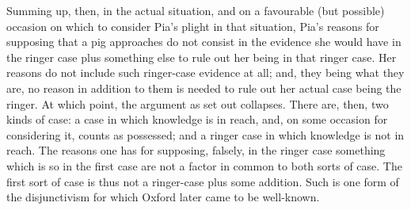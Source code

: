 Summing up, then, in the actual situation, and on a favourable (but possible) occasion on which to consider Pia’s plight in that situation, Pia’s reasons for supposing that a pig approaches do not consist in the evidence she would have in the ringer case plus something else to rule out her being in that ringer case. Her reasons do not include such ringer-case evidence at all; and, they being what they are, no reason in addition to them is needed to rule out her actual case being the ringer. At which point, the argument as set out collapses. There are, then, two kinds of case: a case in which knowledge is in reach, and, on some occasion for considering it, counts as possessed; and a ringer case in which knowledge is not in reach. The reasons one has for supposing, falsely, in the ringer case something which is so in the first case are not a factor in common to both sorts of case. The first sort of case is thus not a ringer-case plus some addition. Such is one form of the disjunctivism for which Oxford later came to be well-known.

